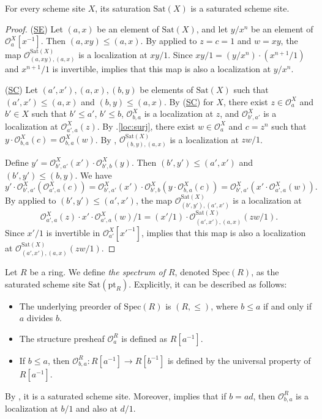 \documentclass[reqno]{amsart}
\newcommand{\axref}[1]{(\hyperref[ax:#1]{#1})}
\theoremstyle{definition}
\theoremstyle{remark}
\numberwithin{figure}{section}
\begin{document}
\begin{prop}
For every scheme site $X$, its saturation $\mathrm{Sat}(X)$ is a saturated scheme site.
\end{prop}
\begin{proof}
\axref{SE}
Let $(a,x)$ be an element of $\mathrm{Sat}(X)$, and let $y/x^n$ be an element of $\mathcal{O}^X_a[x^{-1}]$.
Then $(a, x y) \leq (a,x)$.
By  applied to $z = c = 1$ and $w = x y$, the map $\mathcal{O}^{\mathrm{Sat}(X)}_{(a,xy),(a,x)}$ is a localization at $x y / 1$.
Since $x y / 1 = (y/x^n) \cdot (x^{n+1}/1)$ and $x^{n+1}/1$ is invertible,  implies that this map is also a localization at $y/x^n$.

\axref{SC}
Let $(a',x'), (a,x), (b,y)$ be elements of $\mathrm{Sat}(X)$ such that $(a',x') \leq (a,x)$ and $(b,y) \leq (a,x)$.
By \axref{SC} for $X$, there exist $z \in \mathcal{O}^X_a$ and $b' \in X$ such that $b' \leq a'$, $b' \leq b$,
$\mathcal{O}^X_{b,a}$ is a localization at $z$, and $\mathcal{O}^X_{b',a'}$ is a localization at $\mathcal{O}^X_{a',a}(z)$.
By .\eqref{loc:surj}, there exist $w \in \mathcal{O}^X_a$ and $c = z^n$ such that $y \cdot \mathcal{O}^X_{b,a}(c) = \mathcal{O}^X_{b,a}(w)$.
By , $\mathcal{O}^{\mathrm{Sat}(X)}_{(b,y),(a,x)}$ is a localization at $z w / 1$.

Define $y' = \mathcal{O}^X_{b',a'}(x') \cdot \mathcal{O}^X_{b',b}(y)$.
Then $(b',y') \leq (a',x')$ and $(b',y') \leq (b,y)$.
We have
\[ y' \cdot \mathcal{O}^X_{b',a'}(\mathcal{O}^X_{a',a}(c)) = \mathcal{O}^X_{b',a'}(x') \cdot \mathcal{O}^X_{b',b}(y \cdot \mathcal{O}^X_{b,a}(c)) = \mathcal{O}^X_{b',a'}(x' \cdot \mathcal{O}^X_{a',a}(w)). \]
By  applied to $(b',y') \leq (a',x')$, the map $\mathcal{O}^{\mathrm{Sat}(X)}_{(b',y'),(a',x')}$ is a localization at
\[ \mathcal{O}^X_{a',a}(z) \cdot x' \cdot \mathcal{O}^X_{a',a}(w) / 1 = (x'/1) \cdot \mathcal{O}^{\mathrm{Sat}(X)}_{(a',x'),(a,x)}(z w / 1). \]
Since $x'/1$ is invertible in $\mathcal{O}^X_{a'}[x'^{-1}]$,  implies that this map is also a localization at $\mathcal{O}^{\mathrm{Sat}(X)}_{(a',x'),(a,x)}(z w / 1)$.
\end{proof}

\begin{example}[spec]
Let $R$ be a ring.
We define \emph{the spectrum of $R$}, denoted $\mathrm{Spec}(R)$, as the saturated scheme site $\mathrm{Sat}(\mathrm{pt}_R)$.
Explicitly, it can be described as follows:
\begin{itemize}
\item The underlying preorder of $\mathrm{Spec}(R)$ is $(R,\leq)$, where $b \leq a$ if and only if $a$ divides $b$.
\item The structure presheaf $\mathcal{O}^R_a$ is defined as $R[a^{-1}]$.
\item If $b \leq a$, then $\mathcal{O}^R_{b,a} : R[a^{-1}] \to R[b^{-1}]$ is defined by the universal property of $R[a^{-1}]$.
\end{itemize}
By , it is a saturated scheme site.
Moreover,  implies that if $b = a d$, then $\mathcal{O}^R_{b,a}$ is a localization at $b/1$ and also at $d/1$.
\end{example}
\end{document}
